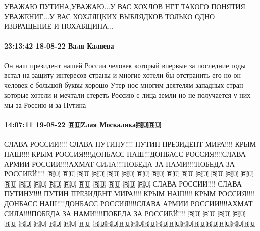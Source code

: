 УВАЖАЮ ПУТИНА,УВАЖАЮ...У ВАС ХОХЛОВ НЕТ ТАКОГО ПОНЯТИЯ УВАЖЕНИЕ...У ВАС
ХОХЛЯЦКИХ ВЫБЛЯДКОВ ТОЛЬКО ОДНО ИЗВРАЩЕНИЕ И ПОХАБЩИНА...

\paragraph{23:13:42 18-08-22 Валя Каляева}

Он наш президент нашей России человек который впервые за последние годы встал
на защиту интересов страны и многие хотели бы отстранить его но он человек с
большой буквы хорошо Утер нос многим деятелям западных стран которые хотели и
мечтали стереть Россию с лица земли но не получается у них мы за Россию и за
Путина

\paragraph{14:07:11 19-08-22 🇷🇺Zлая Москаляка🇷🇺🇷🇺}

СЛАВА РОССИИ!!!! СЛАВА ПУТИНУ!!!! ПУТИН ПРЕЗИДЕНТ МИРА!!!! КРЫМ НАШ!!!! КРЫМ
РОССИЯ!!!!ДОНБАСС НАШ!!!ДОНБАСС РОССИЯ!!!!СЛАВА АРМИИ РОССИИ!!!!АХМАТ
СИЛА!!!!ПОБЕДА ЗА НАМИ!!!!ПОБЕДА ЗА РОССИЕЙ!!!!  🇷🇺 🇷🇺 🇷🇺 🇷🇺 🇷🇺 🇷🇺
🇷🇺 🇷🇺 🇷🇺 🇷🇺 🇷🇺 🇷🇺 🇷🇺 🇷🇺 🇷🇺 🇷🇺 🇷🇺 🇷🇺 🇷🇺 🇷🇺 🇷🇺 🇷🇺
🇷🇺 🇷🇺 СЛАВА РОССИИ!!!! СЛАВА ПУТИНУ!!!! ПУТИН ПРЕЗИДЕНТ МИРА!!!! КРЫМ
НАШ!!!! КРЫМ РОССИЯ!!!! ДОНБАСС НАШ!!!!ДОНБАСС РОССИЯ!!!!СЛАВА АРМИИ
РОССИИ!!!!АХМАТ СИЛА!!!!ПОБЕДА ЗА НАМИ!!!!ПОБЕДА ЗА РОССИЕЙ!!!!  🇷🇺 🇷🇺 🇷🇺
🇷🇺 🇷🇺 🇷🇺 🇷🇺 🇷🇺 🇷🇺 🇷🇺
🇷🇺🇷🇺🇷🇺🇷🇺🇷🇺🇷🇺🇷🇺🇷🇺🇷🇺🇷🇺🇷🇺🇷🇺🇷🇺
